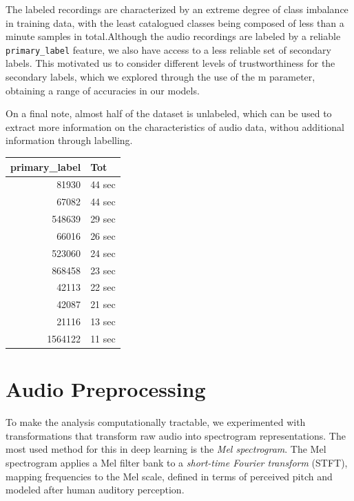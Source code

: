 \documentclass[10pt]{article}
\begin{document}
\begin{minipage}{0.7\linewidth}
The labeled recordings are characterized by an extreme degree of class imbalance in training data, with the least catalogued classes being composed of less than a minute samples in total.Although the audio recordings are labeled by a reliable \texttt{primary\_label} feature, we also have access to a less reliable set of secondary labels. This motivated us to consider different levels of trustworthiness for the secondary labels, which we explored through the use of the m parameter, obtaining a range of accuracies in our models.

On a final note, almost half of the dataset is unlabeled, which can be used to extract more information on the characteristics of audio data, withou additional information through labelling.
\end{minipage}
\hfill
\begin{minipage}{0.3\linewidth}
  \centering
  \begin{tabular}{|r|l|}
    \hline
    \textbf{primary\_label} & \textbf{Tot} \\
    \hline
    81930    & 44 sec \\
    67082    & 44 sec \\
    548639   & 29 sec \\
    66016    & 26 sec \\
    523060   & 24 sec \\
    868458   & 23 sec \\
    42113    & 22 sec \\
    42087    & 21 sec \\
    21116    & 13 sec \\
    1564122  & 11 sec \\
    \hline
  \end{tabular}
\end{minipage}

\section*{Audio Preprocessing}

To make the analysis computationally tractable, we experimented with transformations that transform raw audio into spectrogram representations. The most used method for this in deep learning is the \emph{Mel spectrogram}. The Mel spectrogram applies a Mel filter bank to a \emph{short-time Fourier transform} (STFT), mapping frequencies to the Mel scale, defined in terms of perceived pitch and modeled after human auditory perception.
\end{document}
